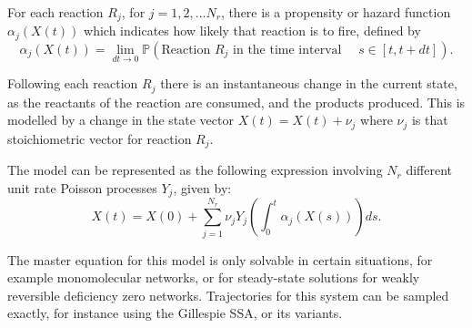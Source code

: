 \documentclass[final]{siamltex}
\begin{document}
For each reaction $R_j$, for $j = 1,2,\ldots N_r$, there is a
propensity or hazard function $\alpha_j(X(t))$ which indicates how
likely that reaction is to fire, defined by
\begin{equation}\alpha_j(X(t)) = \lim_{dt \to 0} \mathbb{P}(\text{Reaction $R_j$ in
    the time interval  } \quad s \in [t, t+ dt] ).\end{equation} %

Following each reaction $R_j$ there is an instantaneous change in the
current state, as the reactants of the reaction are consumed, and the
products produced. This is modelled by a change in the state vector
$X(t) = X(t) + \nu_j$ where $\nu_j$ is that stoichiometric vector for
reaction $R_j$.

The model can be represented as the following expression involving
$N_r$ different unit rate Poisson
processes\cite{anderson2011continuous} $Y_j$, given by:
\begin{equation}\label{eq:RTC}
X(t) = X(0) + \sum_{j=1}^{N_r} \nu_j Y_j \left (\int_0^t
  \alpha_j(X(s)) \right ) ds.
\end{equation}

The master equation for this model is only solvable in certain
situations, for example monomolecular networks\cite{jahnke2007solving}, or for
steady-state solutions for weakly reversible deficiency
zero networks\cite{anderson2010product,anderson2016product}. Trajectories for this system can be
sampled exactly, for instance using the Gillespie SSA\cite{gillespie1977exact}, or
its
variants\cite{gillespie2007stochastic,cao2004efficient,anderson2007modified}. 


\end{document}
